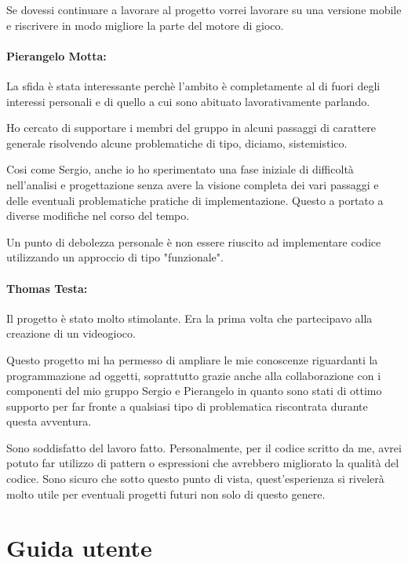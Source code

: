 \documentclass[a4paper,12pt]{report}
\begin{document}
Se dovessi continuare a lavorare al progetto vorrei lavorare su una versione mobile e riscrivere in modo migliore la parte del motore di gioco.

\subsubsection*{Pierangelo Motta:}

La sfida è stata interessante perchè l'ambito è completamente al di fuori degli interessi personali e di quello a cui sono abituato lavorativamente parlando.

Ho cercato di supportare i membri del gruppo in alcuni passaggi di carattere generale risolvendo alcune problematiche di tipo, diciamo, sistemistico.

Cosi come Sergio, anche io ho sperimentato una fase iniziale di difficoltà nell'analisi e progettazione senza avere la visione completa dei vari passaggi e delle eventuali problematiche pratiche di implementazione. Questo a portato a diverse modifiche nel corso del tempo.

Un punto di debolezza personale è non essere riuscito ad implementare codice utilizzando un approccio di tipo "funzionale".

\subsubsection*{Thomas Testa:}

Il progetto è stato molto stimolante. Era la prima volta che partecipavo alla creazione di un videogioco.

Questo progetto mi ha permesso di ampliare le mie conoscenze riguardanti la programmazione ad oggetti, soprattutto grazie anche alla collaborazione con i componenti del mio gruppo Sergio e Pierangelo in quanto sono stati di ottimo supporto per far fronte a qualsiasi tipo di problematica riscontrata durante questa avventura. 

Sono soddisfatto del lavoro fatto. Personalmente, per il codice scritto da me, avrei potuto far utilizzo di pattern o espressioni che avrebbero migliorato la qualità del codice. Sono sicuro che sotto questo punto di vista, quest'esperienza si rivelerà molto utile per eventuali progetti futuri non solo di questo genere.
\paragraph{}

\appendix
\chapter{Guida utente}
\end{document}
